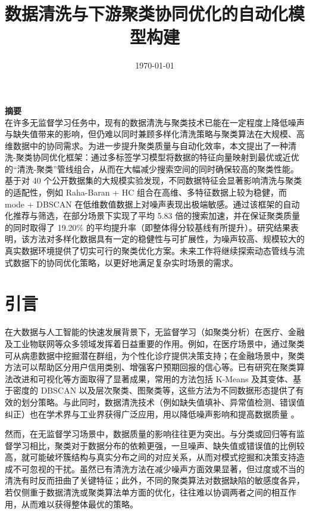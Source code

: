 \documentclass[10pt]{article} %
\numberwithin{equation}{section}
\begin{document}
\title{\textbf{数据清洗与下游聚类协同优化的自动化模型构建}}
\date{\today}
\maketitle

\noindent\textbf{\large 摘要} \\
在许多无监督学习任务中，现有的数据清洗与聚类技术已能在一定程度上降低噪声与缺失值带来的影响，但仍难以同时兼顾多样化清洗策略与聚类算法在大规模、高维数据中的协同需求。为进一步提升聚类质量与自动化效率，本文提出了一种清洗-聚类协同优化框架：通过多标签学习模型将数据的特征向量映射到最优或近优的“清洗-聚类”管线组合，从而在大幅减少搜索空间的同时确保较高的聚类性能。基于对 40 个公开数据集的大规模实验发现，不同数据特征会显著影响清洗与聚类的适配性，例如 Raha-Baran + HC 组合在高维、多特征数据上较为稳健，而 mode + DBSCAN 在低维数值数据上对噪声表现出极端敏感。通过该框架的自动化推荐与筛选，在部分场景下实现了平均 5.83 倍的搜索加速，并在保证聚类质量的同时取得了 19.20\% 的平均提升率（即整体得分较基线有所提升）。研究结果表明，该方法对多样化数据具有一定的稳健性与可扩展性，为噪声较高、规模较大的真实数据环境提供了切实可行的聚类优化方案。未来工作将继续探索动态管线与流式数据下的协同优化策略，以更好地满足复杂实时场景的需求。

\section{引言}
在大数据与人工智能的快速发展背景下，无监督学习（如聚类分析）在医疗、金融及工业物联网等众多领域发挥着日益重要的作用\cite{Aljohani2024, 10729915, Passlick2021}。例如，在医疗场景中，通过聚类可从病患数据中挖掘潜在群组，为个性化诊疗提供决策支持\cite{10.1007/978-3-031-72506-731}；在金融场景中，聚类方法可以帮助区分用户信用类别、增强客户预期回报的信心等\cite{Cai2016}。已有研究在聚类算法改进和可视化等方面取得了显著成果，常用的方法包括 K-Means 及其变体\cite{Bandyapadhyay2024}、基于密度的 DBSCAN 以及层次聚类、图聚类\cite{10.1145/3299876}等，这些方法为不同数据形态提供了有效的划分策略。与此同时，数据清洗技术（例如缺失值填补、异常值检测、错误值纠正）也在学术界与工业界获得广泛应用，用以降低噪声影响和提高数据质量\cite{10.1145/2723372.2749431, 10.1145/2463676.2465327, Rekatsinas2017} 。

然而，在无监督学习场景中，数据质量的影响往往更为突出。与分类或回归等有监督学习相比，聚类对于数据分布的依赖更强，一旦噪声、缺失值或错误值的比例较高，就可能破坏簇结构与真实分布之间的对应关系\cite{ALAM2023100341}，从而对模式挖掘和决策支持造成不可忽视的干扰。虽然已有清洗方法在减少噪声方面效果显著，但过度或不当的清洗有时反而扭曲了关键特征\cite{Ni2023}；此外，不同的聚类算法对数据缺陷的敏感度各异\cite{SINGH2024102799}，若仅侧重于数据清洗或聚类算法单方面的优化，往往难以协调两者之间的相互作用，从而难以获得整体最优的策略。
\end{document}
